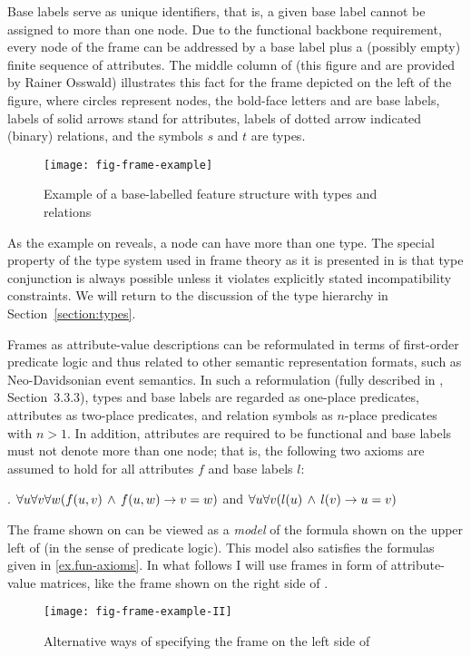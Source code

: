 Base labels serve as unique identifiers, that is, a given base label cannot be assigned to more than one node. Due to the functional backbone requirement, every node of the frame can be addressed by a base label
plus a (possibly empty) finite sequence of attributes.
The middle column of  (this figure and  are provided by Rainer Osswald) illustrates this fact
for the frame depicted on the left of the figure, where circles
represent nodes, the bold-face letters  and  are base
labels, labels of solid arrows stand for attributes, labels of dotted arrow
indicated (binary) relations, and the symbols $s$ and $t$ are types.
%
\begin{figure}
\hfill
\texttt{[image: fig-frame-example]}
\hfill
\caption{Example of a base-labelled feature structure with types and relations}
\label{fig-frame-example}
\end{figure}%
%

As the example on  reveals, a node can have more than one type. The special property of the type system used in frame theory as it is presented in \citealt{KallmeyerOsswald:13} is that type conjunction is always possible unless it violates explicitly stated incompatibility constraints. We will return to the discussion of the type hierarchy in Section~\ref{section:types}.

Frames as attribute-value descriptions can be reformulated in terms of first-order predicate logic and thus related to other semantic representation formats, such as Neo-Davidsonian event semantics. In such a reformulation (fully described in \citealt{KallmeyerOsswald:13}, Section~3.3.3), types and base
labels are regarded as one-place predicates, attributes as two-place predicates, and relation symbols as $n$-place predicates with $n>1$.
In addition, attributes are required to be functional and base labels must
not denote more than one node;
that is, the following two axioms are assumed to hold for all
attributes $f$ and base labels $l$:

\ex.\label{ex.fun-axioms}
$\forall u\forall v\forall w(f(u,v)\,\wedge\, f(u,w)\rightarrow v=w)$
\qquad and \qquad
$\forall u\forall v(l(u)\,\wedge\, l(v)\rightarrow u=v)$

The frame shown on  can be viewed
as a \emph{model} of the formula shown on the upper left of  (in the sense of predicate logic). This model also satisfies the formulas given in \ref{ex.fun-axioms}. In what follows I will use frames in form of attribute-value matrices, like the frame shown on the right side of .
%
\begin{figure}
\hfill
\texttt{[image: fig-frame-example-II]}
\hfill
\caption{Alternative ways of specifying the frame on the left side of
}
\label{fig-frame-example-II}
\end{figure}%
%


